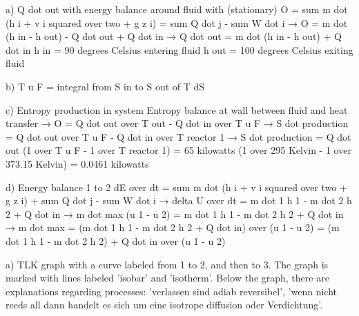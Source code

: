 a) Q dot out with energy balance around fluid with (stationary)  
O = sum m dot (h i + v i squared over two + g z i) = sum Q dot j - sum W dot i  
→ O = m dot (h in - h out) - Q dot out + Q dot in  
→ Q dot out = m dot (h in - h out) + Q dot in  
h in = 90 degrees Celsius entering fluid  
h out = 100 degrees Celsius exiting fluid  

b) T u F = integral from S in to S out of T dS  

c) Entropy production in system  
Entropy balance at wall between fluid and heat transfer  
→ O = Q dot out over T out - Q dot in over T u F  
→ S dot production = Q dot out over T u F - Q dot in over T reactor 1  
→ S dot production = Q dot out (1 over T u F - 1 over T reactor 1)  
= 65 kilowatts (1 over 295 Kelvin - 1 over 373.15 Kelvin)  
= 0.0461 kilowatts  

d) Energy balance 1 to 2  
dE over dt = sum m dot (h i + v i squared over two + g z i) + sum Q dot j - sum W dot i  
→ delta U over dt = m dot 1 h 1 - m dot 2 h 2 + Q dot in  
→ m dot max (u 1 - u 2) = m dot 1 h 1 - m dot 2 h 2 + Q dot in  
→ m dot max = (m dot 1 h 1 - m dot 2 h 2 + Q dot in) over (u 1 - u 2)  
= (m dot 1 h 1 - m dot 2 h 2) + Q dot in over (u 1 - u 2)

a) TLK graph with a curve labeled from 1 to 2, and then to 3. The graph is marked with lines labeled 'isobar' and 'isotherm'. Below the graph, there are explanations regarding processes: 'verlassen sind adiab reversibel', 'wenn nicht reeds all dann handelt es sich um eine isotrope diffusion oder Verdichtung'.